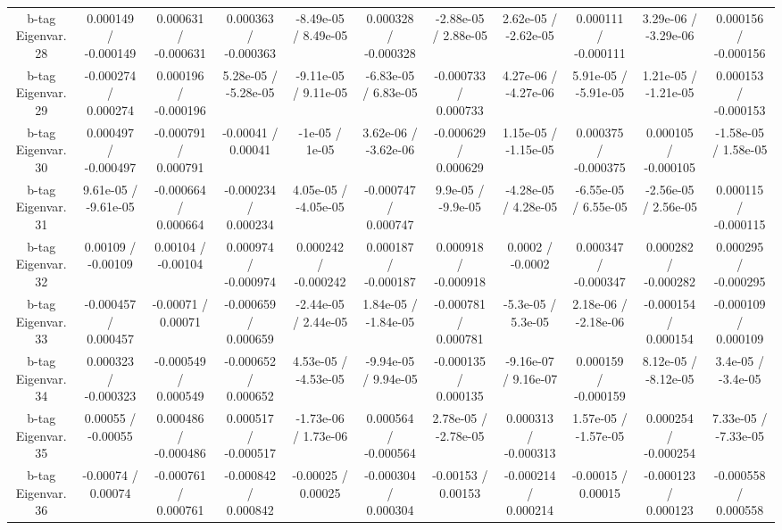 {\begin{landscape}
\begin{longtable}{@{\extracolsep{\fill}}| *{11}{c|}}
  b-tag Eigenvar. 28 & 0.000149 / -0.000149 & 0.000631 / -0.000631 & 0.000363 / -0.000363 & -8.49e-05 / 8.49e-05 & 0.000328 / -0.000328 & -2.88e-05 / 2.88e-05 & 2.62e-05 / -2.62e-05 & 0.000111 / -0.000111 & 3.29e-06 / -3.29e-06 & 0.000156 / -0.000156 \\ 
  b-tag Eigenvar. 29 & -0.000274 / 0.000274 & 0.000196 / -0.000196 & 5.28e-05 / -5.28e-05 & -9.11e-05 / 9.11e-05 & -6.83e-05 / 6.83e-05 & -0.000733 / 0.000733 & 4.27e-06 / -4.27e-06 & 5.91e-05 / -5.91e-05 & 1.21e-05 / -1.21e-05 & 0.000153 / -0.000153 \\ 
  b-tag Eigenvar. 30 & 0.000497 / -0.000497 & -0.000791 / 0.000791 & -0.00041 / 0.00041 & -1e-05 / 1e-05 & 3.62e-06 / -3.62e-06 & -0.000629 / 0.000629 & 1.15e-05 / -1.15e-05 & 0.000375 / -0.000375 & 0.000105 / -0.000105 & -1.58e-05 / 1.58e-05 \\ 
  b-tag Eigenvar. 31 & 9.61e-05 / -9.61e-05 & -0.000664 / 0.000664 & -0.000234 / 0.000234 & 4.05e-05 / -4.05e-05 & -0.000747 / 0.000747 & 9.9e-05 / -9.9e-05 & -4.28e-05 / 4.28e-05 & -6.55e-05 / 6.55e-05 & -2.56e-05 / 2.56e-05 & 0.000115 / -0.000115 \\ 
  b-tag Eigenvar. 32 & 0.00109 / -0.00109 & 0.00104 / -0.00104 & 0.000974 / -0.000974 & 0.000242 / -0.000242 & 0.000187 / -0.000187 & 0.000918 / -0.000918 & 0.0002 / -0.0002 & 0.000347 / -0.000347 & 0.000282 / -0.000282 & 0.000295 / -0.000295 \\ 
  b-tag Eigenvar. 33 & -0.000457 / 0.000457 & -0.00071 / 0.00071 & -0.000659 / 0.000659 & -2.44e-05 / 2.44e-05 & 1.84e-05 / -1.84e-05 & -0.000781 / 0.000781 & -5.3e-05 / 5.3e-05 & 2.18e-06 / -2.18e-06 & -0.000154 / 0.000154 & -0.000109 / 0.000109 \\ 
  b-tag Eigenvar. 34 & 0.000323 / -0.000323 & -0.000549 / 0.000549 & -0.000652 / 0.000652 & 4.53e-05 / -4.53e-05 & -9.94e-05 / 9.94e-05 & -0.000135 / 0.000135 & -9.16e-07 / 9.16e-07 & 0.000159 / -0.000159 & 8.12e-05 / -8.12e-05 & 3.4e-05 / -3.4e-05 \\ 
  b-tag Eigenvar. 35 & 0.00055 / -0.00055 & 0.000486 / -0.000486 & 0.000517 / -0.000517 & -1.73e-06 / 1.73e-06 & 0.000564 / -0.000564 & 2.78e-05 / -2.78e-05 & 0.000313 / -0.000313 & 1.57e-05 / -1.57e-05 & 0.000254 / -0.000254 & 7.33e-05 / -7.33e-05 \\ 
  b-tag Eigenvar. 36 & -0.00074 / 0.00074 & -0.000761 / 0.000761 & -0.000842 / 0.000842 & -0.00025 / 0.00025 & -0.000304 / 0.000304 & -0.00153 / 0.00153 & -0.000214 / 0.000214 & -0.00015 / 0.00015 & -0.000123 / 0.000123 & -0.000558 / 0.000558 \\ 

\end{longtable}
\end{landscape}}
